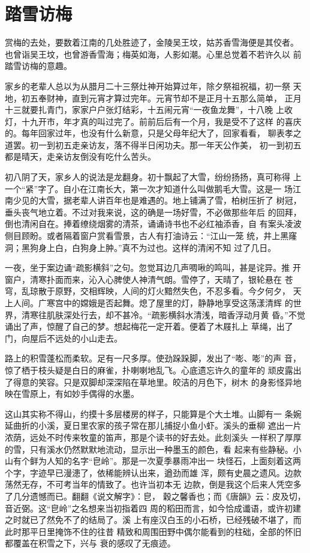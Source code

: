 \chapter{踏雪访梅}

赏梅的去处，要数着江南的几处胜迹了，金陵吴王坟，姑苏香雪海便是其佼者。
也曾诣吴王坟，也曾游香雪海；梅英如海，人影如潮。心里总觉着不若许久以
前踏雪访梅的意趣。

家乡的老辈人总以为从腊月二十三祭灶神开始算过年，除夕祭祖祝福，初一祭
天地，初五奉财神，直到元宵才算过完年。元宵节却不是正月十五那么简单，
正月十三就要扎青门，家家户户张灯结彩，十五闹元宵“一夜鱼龙舞”，十八晚
上收灯，十九开市，年才真的叫过完了。前前后后有一个月，我是受不了这样
的喜庆的。每年回家过年，也没有什么新意，只是父母年纪大了，回家看看，
聊表孝之道罢。初一到初五走亲访友，落不得半日闲功夫。那一年天公作美，
初一到初五都是晴天，走亲访友倒没有吃什么苦头。

初八阴了天，家乡人的说法是龙翻身。初十飘起了大雪，纷纷扬扬，真可称得
上一个“紧”字了。自小在江南长大，第一次才知道什么叫做鹅毛大雪。这是一
场江南少见的大雪，据老辈人讲百年也是难遇的。地上铺满了雪，柏树压折了
树冠，垂头丧气地立着。不过对我来说，这的确是一场好雪，不必做那些年后
的回拜，倒也清闲自在。捧着缭绕烟雾的清茶，诵诵诗书也不必红袖添香，自
有案头凌波侧目顾盼。或者隔着窗户赏看雪景，古人有打油诗云：“江山一笼
统，井上黑窿洞；黑狗身上白，白狗身上肿。”真不为过也。这样的清闲不知
过了几日。

一夜，坐于案边诵“疏影横斜”之句。忽觉耳边几声啁啾的鸣叫，甚是诧异。推
开窗户，清寒扑面而来，沁入心脾使人神清气朗。雪停了，天晴了，银轮悬在
苍穹，乱琼散于原野，交相辉映，人间的灯火黯然失色，不忍多看。今夕何夕，
天上人间。广寒宫中的嫦娥是否起舞。熄了屋里的灯，静静地享受这荡漾清辉
的世界，清寒往肌肤深处行去，却不甚冷。“疏影横斜水清浅，暗香浮动月黄
昏。”不觉诵出了声，惊醒了自己的梦。想起梅花一定开着。便着了木屐扎上
草绳，出了门，向屋后不远处的小山走去。

路上的积雪蓬松而柔软。足有一尺多厚。使劲跺跺脚，发出了“嘭、嘭”的声
音，惊了栖于枝头疑是白日的麻雀，扑喇喇地乱飞。心底遗忘许久的童年的
顽皮露出了得意的笑容。只是双脚却深深陷在草地里。皎洁的月色下，树木
的身影怪异地映在雪原上，有如妙手偶得的水墨。

这山其实称不得山，约摸十多层楼房的样子，只能算是个大土堆。山脚有一
条婉延曲折的小溪，夏日里农家的孩子常在那儿捕捉小鱼小虾。溪头的垂柳
遮出一片浓荫，远处不时传来牧童的笛声，那是个读书的好去处。此刻溪头
一样积了厚厚的雪，只有溪水仍然默默地流动，显示出一种墨玉的颜色，看
起来有些静秘。小山有个鲜为人知的名字“皀岭”。那是一次夏季暴雨冲出一
块怪石，上面刻着这两个字，字迹早已漫漶了，依稀能辨认出来，遒劲而雄
浑，颇有史晨之遗风。边款荡然无存，不可考当年的情致了。也许当初本无
边款，倒是我这个后来人凭空多了几分遗憾而已。翻翻《说文解字》：皀，
穀之馨香也；而《唐韻》云：皮及切，音近弼。这“皀岭”之名想来当初指着四
周的稻田而言，如今恰成谶语，或许初建之时就已了然免不了的结局了。溪
上有座汉白玉的小石桥，已经残破不堪了，而此时那平日里掩饰不住的往昔
精致和周围田野中偶尔能看到的柱础，全部的怀旧都覆盖在积雪之下，兴与
衰的感叹了无痕迹。

